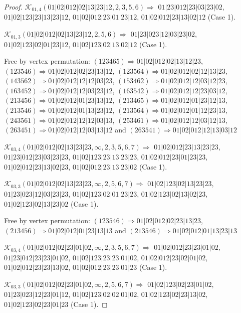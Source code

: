 \documentclass[12pt]{article}
\theoremstyle{plain}
\theoremstyle{definition}
\theoremstyle{remark}
\newcommand{\fancy}[1]{\mathcal{#1}}
\def\K{\fancy{K}}
\begin{document}
\begin{proof}
	
	
	\bigskip
	
	$\K_{01,4}(01|02|012|02|13|23|12,2, 3, 5, 6)\Rightarrow $ $01|23|012|23|03|23|02$, $01|02|123|23|13|23|12$, $01|02|012|23|01|23|12$, $01|02|012|23|13|02|12$ (Case 1).
	
	$\K_{01,3}(01|02|012|02|13|23|12,2, 5, 6)\Rightarrow $ $01|23|023|12|03|23|02$, $01|02|123|02|01|23|12$, $01|02|123|02|13|02|12$ (Case 1).
	
	
	
	Free by vertex permutation: $(1 2 3 4 6 5)\Rightarrow 01|02|012|02|13|12|23$, $(1 2 3 5 4 6)\Rightarrow 01|02|012|02|23|13|12$, $(1 2 3 5 6 4)\Rightarrow 01|02|012|02|12|13|23$, $(1 4 3 5 6 2)\Rightarrow 01|02|012|12|12|03|23$, $(1 5 3 4 6 2)\Rightarrow 01|02|012|12|03|12|23$, $(1 6 3 4 5 2)\Rightarrow 01|02|012|12|03|23|12$, $(1 6 3 5 4 2)\Rightarrow 01|02|012|12|23|03|12$, $(2 1 3 4 5 6)\Rightarrow 01|02|012|01|23|13|12$, $(2 1 3 4 6 5)\Rightarrow 01|02|012|01|23|12|13$, $(2 1 3 5 4 6)\Rightarrow 01|02|012|01|13|23|12$, $(2 1 3 5 6 4)\Rightarrow 01|02|012|01|12|23|13$, $(2 4 3 5 6 1)\Rightarrow 01|02|012|12|12|03|13$, $(2 5 3 4 6 1)\Rightarrow 01|02|012|12|03|12|13$, $(2 6 3 4 5 1)\Rightarrow 01|02|012|12|03|13|12$ and $(2 6 3 5 4 1)\Rightarrow 01|02|012|12|13|03|12$
	
	
	
	\bigskip
	
	$\K_{03,4}(01|02|012|02|13|23|23,\infty,2, 3, 5, 6, 7)\Rightarrow $ $01|02|012|23|13|23|23$, $01|23|012|23|03|23|23$, $01|02|123|23|13|23|23$, $01|02|012|23|01|23|23$, $01|02|012|23|13|02|23$, $01|02|012|23|13|23|02$ (Case 1).
	
	$\K_{03,3}(01|02|012|02|13|23|23,\infty,2, 5, 6, 7)\Rightarrow $ $01|02|123|02|13|23|23$, $01|23|023|12|03|23|23$, $01|02|123|02|01|23|23$, $01|02|123|02|13|02|23$, $01|02|123|02|13|23|02$ (Case 1).
	
	
	
	Free by vertex permutation: $(1 2 3 5 4 6)\Rightarrow 01|02|012|02|23|13|23$, $(2 1 3 4 5 6)\Rightarrow 01|02|012|01|23|13|13$ and $(2 1 3 5 4 6)\Rightarrow 01|02|012|01|13|23|13$
	
	
	
	\bigskip
	
	$\K_{03,4}(01|02|012|02|23|01|02,\infty,2, 3, 5, 6, 7)\Rightarrow $ $01|02|012|23|23|01|02$, $01|23|012|23|23|01|02$, $01|02|123|23|23|01|02$, $01|02|012|23|02|01|02$, $01|02|012|23|23|13|02$, $01|02|012|23|23|01|23$ (Case 1).
	
	$\K_{03,3}(01|02|012|02|23|01|02,\infty,2, 5, 6, 7)\Rightarrow $ $01|02|123|02|23|01|02$, $01|23|023|12|23|01|12$, $01|02|123|02|02|01|02$, $01|02|123|02|23|13|02$, $01|02|123|02|23|01|23$ (Case 1).
	

\end{proof}
\end{document}
